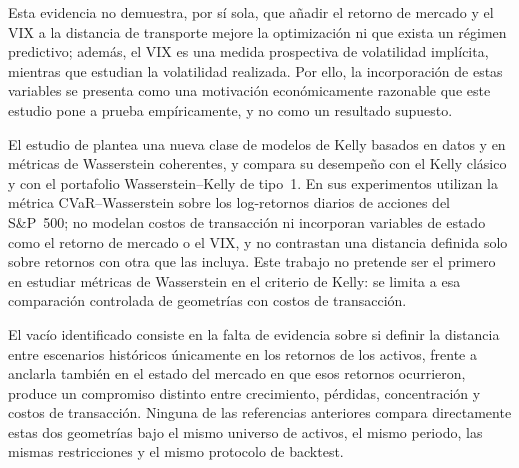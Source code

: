 \documentclass[11pt]{article}
\begin{document}
Esta evidencia no demuestra, por sí sola, que añadir el retorno de mercado y el VIX a la distancia de transporte mejore la optimización ni que exista un régimen predictivo; además, el VIX es una medida prospectiva de volatilidad implícita, mientras que \citet{french1987} estudian la volatilidad realizada. Por ello, la incorporación de estas variables se presenta como una motivación económicamente razonable que este estudio pone a prueba empíricamente, y no como un resultado supuesto.
 

El estudio de \citet{sunzou2025} plantea
una nueva clase de modelos de Kelly basados en datos y en métricas de Wasserstein coherentes, y compara su desempeño con el Kelly clásico y con el portafolio Wasserstein--Kelly de tipo~1. En sus experimentos utilizan la métrica CVaR--Wasserstein sobre los log-retornos diarios de acciones del S\&P~500; no modelan costos de transacción ni incorporan variables de estado como el retorno de mercado o el VIX, y no contrastan una distancia definida solo sobre retornos con otra que las incluya. Este trabajo no pretende ser el primero en estudiar métricas de Wasserstein en el criterio de Kelly: se limita a esa comparación controlada de geometrías con costos de transacción.

El vacío identificado consiste en
 la falta de evidencia sobre si definir la distancia entre escenarios históricos
únicamente en los retornos de los activos, frente a anclarla también en el estado del mercado en que esos retornos ocurrieron, produce un compromiso distinto entre crecimiento, pérdidas, concentración y costos de transacción. Ninguna de las referencias anteriores compara directamente estas dos
geometrías bajo el mismo universo de activos, el mismo periodo, las mismas restricciones y
el mismo protocolo de backtest.
\end{document}
